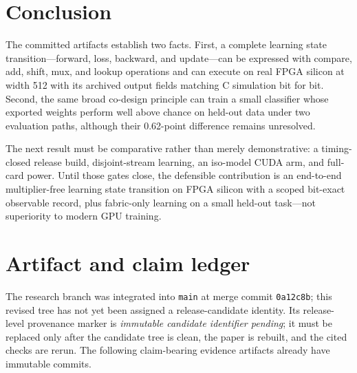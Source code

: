 \documentclass[10pt]{article}
\begin{document}
\section{Conclusion}

The committed artifacts establish two facts.  First, a complete learning state
transition---forward, loss, backward, and update---can be expressed with
compare, add, shift, mux, and lookup operations and can execute on real FPGA
silicon at width 512 with its archived output fields matching C simulation bit
for bit.  Second, the same broad co-design principle can train a small
classifier whose exported weights perform well above chance on held-out data
under two evaluation paths, although their 0.62-point difference remains
unresolved.

The next result must be comparative rather than merely demonstrative: a
timing-closed release build, disjoint-stream learning, an iso-model CUDA arm,
and full-card power.  Until those gates close, the defensible contribution is
an end-to-end multiplier-free learning state transition on FPGA silicon with a
scoped bit-exact observable record, plus fabric-only learning on a small held-out
task---not superiority to modern GPU training.

\appendix

\section{Artifact and claim ledger}
\label{sec:artifact-ledger}

The research branch was integrated into \texttt{main} at merge commit
\texttt{0a12c8b}; this revised tree has not yet been assigned a release-candidate
identity.  Its release-level provenance marker is
\textit{immutable candidate identifier pending}; it must be replaced only after the
candidate tree is clean, the paper is rebuilt, and the cited checks are rerun.
The following claim-bearing evidence artifacts already have immutable commits.
\end{document}
